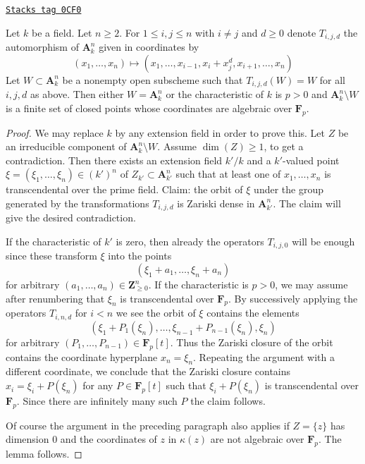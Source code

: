 \begin{lemma}[Orbits]
\label{descent-lemma-orbits}
\href{https://stacks.math.columbia.edu/tag/0CF0}{\texttt{Stacks tag 0CF0}}

Let $k$ be a field. Let $n \geq 2$. For $1 \leq i, j \leq n$ with
$i \not = j$ and $d \geq 0$ denote $T_{i, j, d}$ the automorphism
of $\mathbf{A}^n_k$ given in coordinates by
$$
(x_1, \ldots, x_n) \longmapsto
(x_1, \ldots, x_{i - 1}, x_i + x_j^d, x_{i + 1}, \ldots, x_n)
$$
Let $W \subset \mathbf{A}^n_k$ be a nonempty open subscheme
such that $T_{i, j, d}(W) = W$ for all $i, j, d$ as above.
Then either $W = \mathbf{A}^n_k$ or the characteristic of $k$
is $p > 0$ and $\mathbf{A}^n_k \setminus W$ is a finite set
of closed points whose coordinates are algebraic over $\mathbf{F}_p$.
\end{lemma}

\begin{proof}
We may replace $k$ by any extension field in order to prove this.
Let $Z$ be an irreducible component of $\mathbf{A}^n_k \setminus W$.
Assume $\dim(Z) \geq 1$, to get a contradiction.
Then there exists an extension field $k'/k$ and a $k'$-valued
point $\xi = (\xi_1, \ldots, \xi_n) \in (k')^n$ of
$Z_{k'} \subset \mathbf{A}^n_{k'}$
such that at least one of $x_1, \ldots, x_n$ is transcendental over the
prime field. Claim: the orbit of $\xi$ under the group generated by
the transformations $T_{i, j, d}$ is Zariski
dense in $\mathbf{A}^n_{k'}$. The claim will give the desired contradiction.

\medskip\noindent
If the characteristic of $k'$ is zero, then already the operators
$T_{i, j, 0}$ will be enough since these transform $\xi$ into
the points
$$
(\xi_1 + a_1, \ldots, \xi_n + a_n)
$$
for arbitrary $(a_1, \ldots, a_n) \in \mathbf{Z}_{\geq 0}^n$.
If the characteristic is $p > 0$, we may assume after renumbering
that $\xi_n$ is transcendental over $\mathbf{F}_p$. By
successively applying the operators $T_{i, n, d}$ for
$i < n$ we see the orbit of $\xi$ contains the elements
$$
(\xi_1 + P_1(\xi_n), \ldots, \xi_{n - 1} + P_{n - 1}(\xi_n), \xi_n)
$$
for arbitrary $(P_1, \ldots, P_{n - 1}) \in \mathbf{F}_p[t]$.
Thus the Zariski closure of the orbit contains the coordinate
hyperplane $x_n = \xi_n$. Repeating the argument with a different
coordinate, we conclude that the Zariski closure contains
$x_i = \xi_i + P(\xi_n)$ for any $P \in \mathbf{F}_p[t]$
such that $\xi_i + P(\xi_n)$ is transcendental over $\mathbf{F}_p$.
Since there are infinitely many such $P$ the claim follows.

\medskip\noindent
Of course the argument in the preceding paragraph also applies
if $Z = \{z\}$ has dimension $0$ and the coordinates of $z$
in $\kappa(z)$ are not algebraic over $\mathbf{F}_p$. The lemma follows.
\end{proof}

